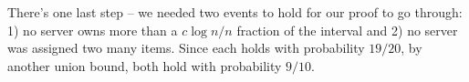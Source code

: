 \documentclass[11pt]{article}
\DeclareMathOperator*{\E}{\mathbb{E}}
\begin{document}
	There's one last step -- we needed two events to hold for our proof to go through: 1) no server owns more than a $c\log n / n$ fraction of the interval and 2) no server was assigned two many items. Since each holds with probability $19/20$, by another union bound, both hold with probability $9/10$.
	

	

\end{document}

